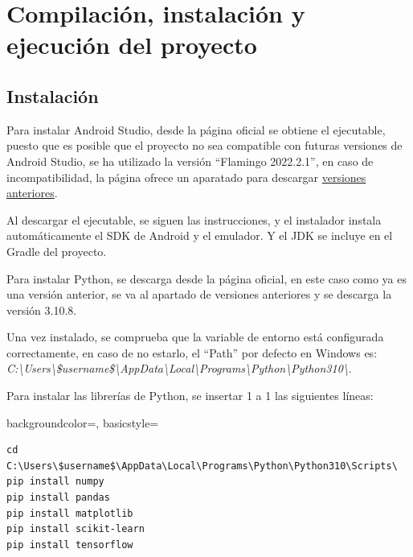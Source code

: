 \section{Compilación, instalación y ejecución del proyecto}

\subsection{Instalación}


Para instalar Android Studio, desde la página oficial se obtiene el ejecutable, puesto que es posible que el proyecto no sea compatible con futuras versiones de Android Studio, se ha utilizado la versión ``Flamingo 2022.2.1'', en caso de incompatibilidad, la página ofrece un aparatado para descargar \href{https://developer.android.com/studio/archive?hl=es-419}{versiones anteriores}.

Al descargar el ejecutable, se siguen las instrucciones, y el instalador instala automáticamente el SDK de Android y el emulador. Y el JDK se incluye en el Gradle del proyecto.

Para instalar Python, se descarga desde la página oficial, en este caso como ya es una versión anterior, se va al apartado de versiones anteriores y se descarga la versión 3.10.8.

Una vez instalado, se comprueba que la variable de entorno está configurada correctamente, en caso de no estarlo, el ``Path'' por defecto en Windows es: \textit{C:\textbackslash Users\textbackslash \$username\$\textbackslash AppData\textbackslash Local\textbackslash Programs\textbackslash Python\textbackslash Python310\textbackslash }. 

Para instalar las librerías de Python, se insertar 1 a 1 las siguientes líneas:

{
    backgroundcolor=\color{black},
    basicstyle=\scriptsize\color{white}\ttfamily
}
\begin{lstlisting}
cd C:\Users\$username$\AppData\Local\Programs\Python\Python310\Scripts\
pip install numpy
pip install pandas
pip install matplotlib
pip install scikit-learn
pip install tensorflow

\end{lstlisting}


